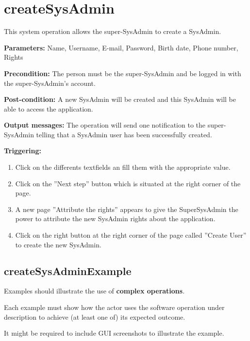 \section{createSysAdmin}
\label{operation:createSysAdmin}
This system operation allows the super-SysAdmin to create a SysAdmin.

\begin{description}

\item \textbf{Parameters:} Name, Username, E-mail, Password, Birth date, Phone
number, Rights
\item \textbf{Precondition:} The person must be the super-SysAdmin and be logged
in with the super-SysAdmin's account.
\item \textbf{Post-condition:} A new SysAdmin will be created and this
SysAdmin will be able to access the application.
\item \textbf{Output messages:} The operation will send one notification to the
super-SysAdmin telling that a SysAdmin user has been successfully created.


\item \textbf{Triggering:}
\begin{enumerate}
\item Click on the differents textfields an fill them with the appropriate
value.
\item Click on the ''Next step'' button which is situated at the right corner of
the page.
\item A new page ''Attribute the rights'' appears to give the SuperSysAdmin the
power to attribute the new SysAdmin rights about the application.
\item Click on the right button at the right corner of the page called
''Create User'' to create the new SysAdmin.

\end{enumerate}

 
\end{description}

 
\subsection{createSysAdminExample}
Examples should illustrate the use of \textbf{complex operations}.

Each example must show how the actor uses the software operation under
description to achieve (at least one of) its expected outcome.

It might be required to include GUI screenshots to illustrate the example.









